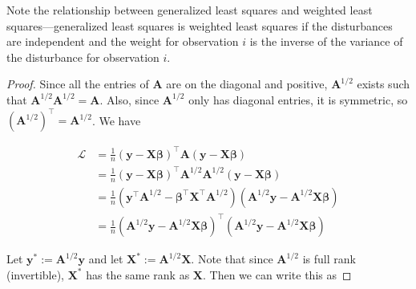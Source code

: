 \begin{remark}

Note the relationship between generalized least squares and weighted least squares---generalized least squares is weighted least squares if the disturbances are independent and the weight for observation \(i\) is the inverse of the variance of the disturbance for observation \(i\).

\end{remark}

\begin{proof}

Since all the entries of \(\boldsymbol{A}\) are on the diagonal and positive, \({\boldsymbol{A}}^{1/2}\) exists such that \({\boldsymbol{A}}^{1/2}{\boldsymbol{A}}^{1/2} = \boldsymbol{A}\). Also, since \({\boldsymbol{A}}^{1/2}\) only has diagonal entries, it is symmetric, so  \( \left({\boldsymbol{A}}^{1/2} \right)^\top =  {\boldsymbol{A}}^{1/2}\). We have

\begin{align*}
\mathcal{L} & =\frac{1}{n}\left(\boldsymbol{y} - \boldsymbol{X}\boldsymbol{\beta}\right)^\top\boldsymbol{A} \left(\boldsymbol{y} - \boldsymbol{X}\boldsymbol{\beta}\right)
\\  & =\frac{1}{n}\left(\boldsymbol{y} - \boldsymbol{X}\boldsymbol{\beta}\right)^\top{\boldsymbol{A}}^{1/2} {\boldsymbol{A}}^{1/2} \left(\boldsymbol{y} - \boldsymbol{X}\boldsymbol{\beta}\right)
\\  & =\frac{1}{n}\left({\boldsymbol{y}}^\top{\boldsymbol{A}}^{1/2} - \boldsymbol{\beta}^\top{\boldsymbol{X}}^\top{\boldsymbol{A}}^{1/2} \right) \left({\boldsymbol{A}}^{1/2} \boldsymbol{y} - {\boldsymbol{A}}^{1/2} \boldsymbol{X}\boldsymbol{\beta}\right)
\\  & =\frac{1}{n} \left({\boldsymbol{A}}^{1/2} \boldsymbol{y} - {\boldsymbol{A}}^{1/2} \boldsymbol{X}\boldsymbol{\beta}\right)^\top \left({\boldsymbol{A}}^{1/2} \boldsymbol{y} - {\boldsymbol{A}}^{1/2} \boldsymbol{X}\boldsymbol{\beta}\right)
\end{align*}

Let \({\boldsymbol{y}}^* := {\boldsymbol{A}}^{1/2} \boldsymbol{y} \) and let \({\boldsymbol{X}}^* := {\boldsymbol{A}}^{1/2} \boldsymbol{X}\). Note that since \( {\boldsymbol{A}}^{1/2} \) is full rank (invertible), \({\boldsymbol{X}}^*\) has the same rank as \(\boldsymbol{X}\). Then we can write this as


\end{proof}
